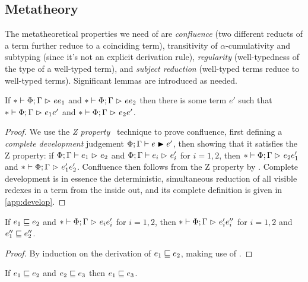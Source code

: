 \documentclass[acmsmall,review,anonymous]{acmart}\settopmatter{printfolios=true,printccs=false,printacmref=false}
\begin{document}
\subsection{Metatheory}

The metatheoretical properties we need of \lang are
\emph{confluence} (two different reducts of a term further reduce to a coinciding term),
transitivity of $\alpha$-cumulativity and subtyping (since it's not an explicit derivation rule),
\emph{regularity} (well-typedness of the type of a well-typed term),
and \emph{subject reduction} (well-typed terms reduce to well-typed terms).
Significant lemmas are introduced as needed.

\begin{theorem}[Confluence] \label{thm:confluence}
If $* \mathrel{\vdash} \Phi; \Gamma \mathrel{\rhd}_{} e{e_1}$ and $* \mathrel{\vdash} \Phi; \Gamma \mathrel{\rhd}_{} e{e_2}$
then there is some term $e'$ such that
$* \mathrel{\vdash} \Phi; \Gamma \mathrel{\rhd}_{} e_1{e'}$ and $* \mathrel{\vdash} \Phi; \Gamma \mathrel{\rhd}_{} e_2{e'}$.
\end{theorem}

\begin{proof}
We use the \emph{Z property}~\citep{Z, confluence} technique to prove confluence,
first defining a \emph{complete development} judgement $\Phi; \Gamma \mathrel{\vdash} e \mathrel{\blacktriangleright} e'$,
then showing that it satisfies the Z property:
if $\Phi; \Gamma \mathrel{\vdash} e_1 \mathrel{\rhd}_{} e_2$ and $\Phi; \Gamma \mathrel{\vdash} e_i \mathrel{\rhd}_{} e'_i$ for $i = 1, 2$,
then $* \mathrel{\vdash} \Phi; \Gamma \mathrel{\rhd}_{} e_2{e'_1}$ and $* \mathrel{\vdash} \Phi; \Gamma \mathrel{\rhd}_{} e'_1{e'_2}$.
Confluence then follows from the Z property by \opcit.
Complete development is in essence the deterministic, simultaneous reduction
of all visible redexes in a term from the inside out,
and its complete definition is given in \cref{app:develop}.
\end{proof}

\begin{theorem} \label{thm:confluence-acum}
If $e_1 \mathrel{\sqsubseteq} e_2$ and $* \mathrel{\vdash} \Phi; \Gamma \mathrel{\rhd}_{} e_i{e'_i}$ for $i = 1, 2$,
then $* \mathrel{\vdash} \Phi; \Gamma \mathrel{\rhd}_{} e'_i{e''_i}$ for $i = 1, 2$ and $e''_1 \mathrel{\sqsubseteq} e''_2$.
\end{theorem}

\begin{proof}
By induction on the derivation of $e_1 \mathrel{\sqsubseteq} e_2$,
making use of .
\end{proof}

\begin{lemma} \label{lem:acum-trans}
If $e_1 \mathrel{\sqsubseteq} e_2$ and $e_2 \mathrel{\sqsubseteq} e_3$ then $e_1 \mathrel{\sqsubseteq} e_3$.
\end{lemma}
\end{document}
